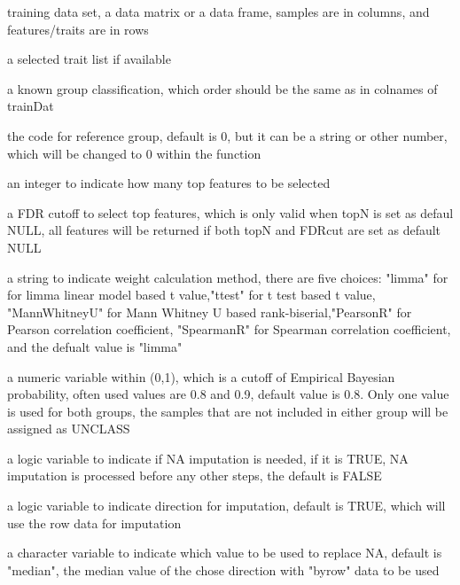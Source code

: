 \documentclass[letterpaper]{book}
\begin{document}
\begin{Arguments}
\begin{ldescription}
\item[\code{trainDat}] training data set, a data matrix or a data frame, samples are in columns, and features/traits are in rows

\item[\code{selectedTraits}] a selected trait list if available

\item[\code{groupInfo}] a known group classification, which order should be the same as in colnames of trainDat

\item[\code{refGroup}] the code for reference group, default is 0, but it can be a string or other number, which will be 
changed to 0 within the function

\item[\code{topN}] an integer to indicate how many top features to be selected

\item[\code{FDRcut}] a FDR cutoff to select top features, which is only valid when topN is set as defaul NULL, 
all features will be returned if both topN and FDRcut are set as default NULL

\item[\code{weightMethod}] a string to indicate weight calculation method, there are five choices: 
"limma" for for limma linear model based t value,"ttest" for t test based t value, 
"MannWhitneyU" for Mann Whitney U based rank-biserial,"PearsonR" for Pearson correlation coefficient,
"SpearmanR" for Spearman correlation coefficient, and the defualt value is "limma"

\item[\code{classProbCut}] a numeric variable within (0,1), which is a cutoff of Empirical Bayesian probability, 
often used values are 0.8 and 0.9, default value is 0.8. Only one value is used for both groups, 
the samples that are not included in either group will be assigned as UNCLASS

\item[\code{imputeNA}] a logic variable to indicate if NA imputation is needed, if it is TRUE, 
NA imputation is processed before any other steps, the default is FALSE

\item[\code{byrow}] a logic variable to indicate direction for imputation, default is TRUE, 
which will use the row data for imputation

\item[\code{imputeValue}] a character variable to indicate which value to be used to replace NA, default is "median", 
the median value of the chose direction with "byrow" data to be used
\end{ldescription}
\end{Arguments}
\end{document}
